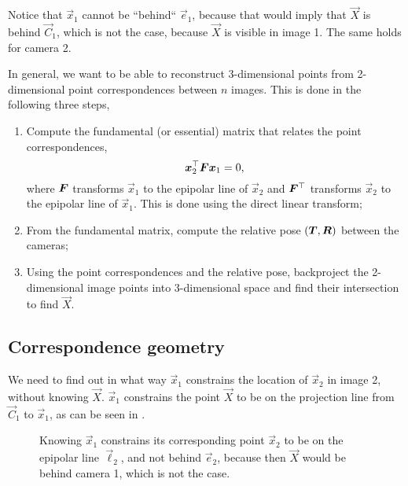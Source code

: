 Notice that $\vec{x}_1$ cannot be ``behind`` $\vec{e}_1$, because that would
imply that $\vec{X}$ is behind $\vec{C}_1$, which is not the case, because
$\vec{X}$ is visible in image 1. The same holds for camera 2.

In general, we want to be able to reconstruct 3-dimensional points from
2-dimensional point correspondences between $n$ images. This is done in the
following three steps,
\begin{enumerate}
  \item Compute the fundamental (or essential) matrix that relates the point
    correspondences, \[
      \bm{x}_2^\top \bm{F} \bm{x}_1 = 0
    ,\]
    where $\bm{F}$ transforms $\vec{x}_1$ to the epipolar line of $\vec{x}_2$
    and $\bm{F}^\top$ transforms $\vec{x}_2$ to the epipolar line of
    $\vec{x}_1$. This is done using the direct linear transform;

  \item From the fundamental matrix, compute the relative pose
    $(\bm{T},\bm{R})$ between the cameras;

  \item Using the point correspondences and the relative pose, backproject the
    2-dimensional image points into 3-dimensional space and find their
    intersection to find $\vec{X}$.

\end{enumerate}

\subsection{Correspondence geometry}

We need to find out in what way $\vec{x}_1$ constrains the location of
$\vec{x}_2$ in image 2, without knowing $\vec{X}$. $\vec{x}_1$ constrains the
point $\vec{X}$ to be on the projection line from $\vec{C}_1$ to $\vec{x}_1$,
as can be seen in .

\begin{figure}[ht]
    \centering
    \caption{Knowing $\vec{x}_1$ constrains its corresponding point $\vec{x}_2$
    to be on the epipolar line $\vec{\ell}_2$, and not behind $\vec{e}_2$,
    because then $\vec{X}$ would be behind camera 1, which is not the case.}
    \label{fig:image-1-constraint}
\end{figure}

